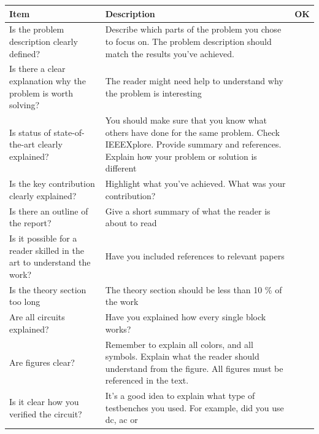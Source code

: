 \begin{longtable}[]{@{}
  >{\raggedright\arraybackslash}p{}
  >{\raggedright\arraybackslash}p{}
  >{\raggedright\arraybackslash}p{}@{}}
\toprule\noalign{}
\begin{minipage}[b]{\linewidth}\raggedright
\textbf{Item}
\end{minipage} & \begin{minipage}[b]{\linewidth}\raggedright
\textbf{Description}
\end{minipage} & \begin{minipage}[b]{\linewidth}\raggedright
\textbf{OK}
\end{minipage} \\
\midrule\noalign{}
\endhead
\bottomrule\noalign{}
\endlastfoot
Is the problem description clearly defined? & Describe which parts of
the problem you chose to focus on. The problem description should match
the results you've achieved. & \\
Is there a clear explanation why the problem is worth solving? & The
reader might need help to understand why the problem is interesting & \\
Is status of state-of-the-art clearly explained? & You should make sure
that you know what others have done for the same problem. Check
IEEEXplore. Provide summary and references. Explain how your problem or
solution is different & \\
Is the key contribution clearly explained? & Highlight what you've
achieved. What was your contribution? & \\
Is there an outline of the report? & Give a short summary of what the
reader is about to read & \\
Is it possible for a reader skilled in the art to understand the work? &
Have you included references to relevant papers & \\
Is the theory section too long & The theory section should be less than
10 \% of the work & \\
Are all circuits explained? & Have you explained how every single block
works? & \\
Are figures clear? & Remember to explain all colors, and all symbols.
Explain what the reader should understand from the figure. All figures
must be referenced in the text. & \\
Is it clear how you verified the circuit? & It's a good idea to explain
what type of testbenches you used. For example, did you use dc, ac or

\end{longtable}
